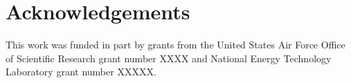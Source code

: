 \documentclass[preprint,12pt]{elsarticle}
\begin{document}

\section{Acknowledgements}
This work was funded in part by grants from the United States Air Force Office of Scientific
Research grant number XXXX and National Energy Technology Laboratory grant number XXXXX. 
\label{sec:ack}






\end{document}
